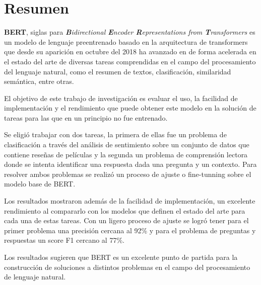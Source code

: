 \cleardoublepage

\chapter*{Resumen}
\label{chpater-resumen}

\textbf{BERT}, siglas para \textit{\textbf{B}idirectional \textbf{E}ncoder \textbf{R}epresentations from \textbf{T}ransformers} es un modelo de lenguaje preentrenado basado en la arquitectura de transformers que desde su aparición en octubre del 2018 ha avanzado en de forma acelerada en el estado del arte de diversas tareas comprendidas en el campo del procesamiento del lenguaje natural, como el resumen de textos, clasificación, similaridad semántica, entre otras.

El objetivo de este trabajo de investigación es evaluar el uso, la facilidad de implementación y el rendimiento que puede obtener este modelo en la solución de tareas para las que en un principio no fue entrenado.

Se eligió trabajar con dos tareas, la primera de ellas fue un problema de clasificación a través del análisis de sentimiento sobre un conjunto de datos que contiene reseñas de películas y la segunda un problema de comprensión lectora donde se intenta identificar una respuesta dada una pregunta y un contexto. Para resolver ambos problemas se realizó un proceso de ajuste o fine-tunning sobre el modelo base de BERT. 

Los resultados mostraron además de la facilidad de implementación, un excelente rendimiento al compararlo con los modelos que definen el estado del arte para cada una de estas tareas. Con un ligero proceso de ajuste se logró tener para el primer problema una precisión cercana al 92\% y para el problema de preguntas y respuestas un score F1 cercano al 77\%.

Los resultados sugieren que BERT es un excelente punto de partida para la construcción de soluciones a distintos problemas en el campo del procesamiento de lenguaje natural. 